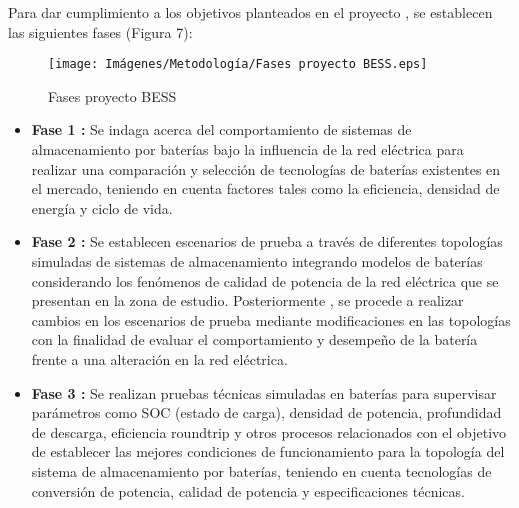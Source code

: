 Para dar cumplimiento a los objetivos planteados en el proyecto , se establecen  las siguientes fases  (Figura 7):

\begin{figure}[h!]
    \begin{center}
    \centering
    \texttt{[image: Imágenes/Metodología/Fases proyecto BESS.eps]}
	\caption{Fases proyecto BESS}
    \end{center}
\end{figure}



\begin{itemize}
    \item 
    \textbf{Fase 1 :} Se indaga acerca del comportamiento  de sistemas de almacenamiento por baterías bajo la influencia de la red eléctrica 
    para realizar una comparación y selección de tecnologías de baterías existentes en el mercado, teniendo en cuenta factores tales como la eficiencia, densidad de energía y ciclo de vida.
    \item 
   \textbf{Fase 2 : }Se establecen escenarios de prueba a través de diferentes topologías simuladas de sistemas de almacenamiento integrando modelos de baterías considerando los fenómenos de calidad de potencia de la red eléctrica que se presentan en la zona de estudio. Posteriormente , se procede a realizar cambios en los escenarios de prueba mediante modificaciones en las topologías con la finalidad de evaluar el comportamiento y desempeño de la batería frente a una alteración en la red eléctrica.
\newpage    
    \item 
    \textbf{Fase 3 : }
    Se realizan pruebas técnicas simuladas en baterías para supervisar parámetros como SOC (estado de carga), densidad de potencia, profundidad de descarga, eficiencia roundtrip y otros procesos relacionados con el objetivo de establecer las mejores condiciones de funcionamiento para la topología del sistema de almacenamiento por baterías, teniendo en cuenta tecnologías de conversión de potencia, calidad de potencia y especificaciones técnicas.
\end{itemize}

